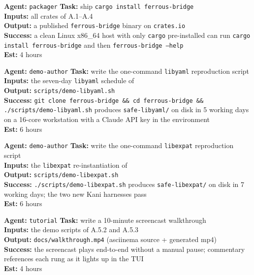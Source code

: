 \documentclass[12pt]{article}
\theoremstyle{definition}
\theoremstyle{remark}
\newcommand{\libyaml}{\texttt{libyaml}}
\newcommand{\libexpat}{\texttt{libexpat}}
\newenvironment{tasklist}{%
  \begingroup\raggedright
  \begin{description}[style=nextline, leftmargin=1.4cm, itemsep=0.4em]
}{%
  \end{description}
  \endgroup
}
\begin{document}
\begin{tasklist}
\item[\textbf{Task A.5.1}] \textbf{Agent:} \texttt{packager} \quad
  \textbf{Task:} ship \texttt{cargo install ferrous-bridge}\\
  \textbf{Inputs:} all crates of A.1--A.4\\
  \textbf{Output:} a published \texttt{ferrous-bridge} binary on
  \texttt{crates.io}\\
  \textbf{Success:} a clean Linux x86\_64 host with only \texttt{cargo}
  pre-installed can run \texttt{cargo install ferrous-bridge} and then
  \texttt{ferrous-bridge --help}\\
  \textbf{Est:} 4 hours

\item[\textbf{Task A.5.2}] \textbf{Agent:} \texttt{demo-author} \quad
  \textbf{Task:} write the one-command \libyaml{} reproduction script\\
  \textbf{Inputs:} the seven-day \libyaml{} schedule of
  \\
  \textbf{Output:}
  \texttt{scripts/demo-libyaml.sh}\\
  \textbf{Success:} \texttt{git clone ferrous-bridge \&\& cd
  ferrous-bridge \&\& ./scripts/demo-libyaml.sh} produces
  \texttt{safe-libyaml/} on disk in 5 working days on a 16-core
  workstation with a Claude API key in the environment\\
  \textbf{Est:} 6 hours

\item[\textbf{Task A.5.3}] \textbf{Agent:} \texttt{demo-author} \quad
  \textbf{Task:} write the one-command \libexpat{} reproduction script\\
  \textbf{Inputs:} the \libexpat{} re-instantiation of
  \\
  \textbf{Output:}
  \texttt{scripts/demo-libexpat.sh}\\
  \textbf{Success:} \texttt{./scripts/demo-libexpat.sh} produces
  \texttt{safe-libexpat/} on disk in 7 working days; the two new Kani
  harnesses pass\\
  \textbf{Est:} 6 hours

\item[\textbf{Task A.5.4}] \textbf{Agent:} \texttt{tutorial} \quad
  \textbf{Task:} write a 10-minute screencast walkthrough\\
  \textbf{Inputs:} the demo scripts of A.5.2 and A.5.3\\
  \textbf{Output:}
  \texttt{docs/walkthrough.mp4} (asciinema source +
  generated mp4)\\
  \textbf{Success:} the screencast plays end-to-end without a manual
  pause; commentary references each rung as it lights up in the TUI\\
  \textbf{Est:} 4 hours


\end{tasklist}
\end{document}
